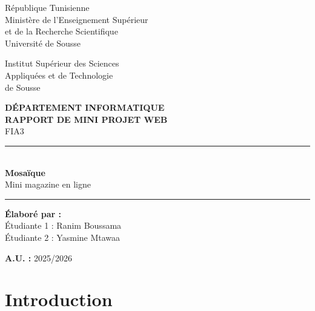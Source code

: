\documentclass[12pt,a4paper]{article}
\begin{document}
\begin{titlepage}
  \thispagestyle{empty}
  \begin{minipage}[t]{0.48\textwidth}
    \centering\small
    République Tunisienne\\
    Ministère de l'Enseignement Supérieur\\
    et de la Recherche Scientifique\\
    Université de Sousse
  \end{minipage}\hfill
  \begin{minipage}[t]{0.48\textwidth}
    \centering\small
    Institut Supérieur des Sciences\\
    Appliquées et de Technologie\\
    de Sousse
  \end{minipage}

  \vspace{2.5cm}
  \begin{center}
    {\large\bfseries DÉPARTEMENT INFORMATIQUE}\\[2cm]
    {\LARGE\bfseries RAPPORT DE MINI PROJET WEB}\\[0.6cm]
    {\Large FIA3}\\[2cm]
    {\color{terracotta}\rule{0.6\textwidth}{1pt}}\\[0.5cm]
    {\Huge\bfseries Mosaïque}\\[0.3cm]
    {\Large Mini magazine en ligne}\\[0.3cm]
    {\color{terracotta}\rule{0.6\textwidth}{1pt}}
  \end{center}

  \vspace{2cm}
  \noindent\textbf{Élaboré par :}\\[0.3cm]
  \hspace*{4cm}Étudiante 1 : Ranim Boussama\\
  \hspace*{4cm}Étudiante 2 : Yasmine Mtawaa

  \vfill
  \noindent\textbf{A.U. :} 2025/2026
\end{titlepage}

\renewcommand{\contentsname}{Plan}
\tableofcontents
\newpage

\section{Introduction}
\end{document}
